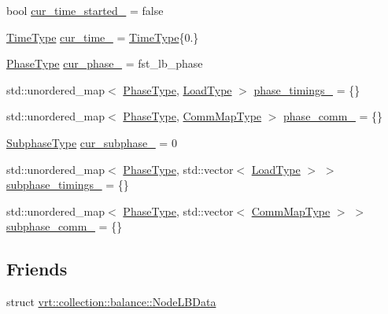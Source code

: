 \begin{DoxyCompactItemize}
\item 
bool \hyperlink{structvt_1_1elm_1_1_element_l_b_data_ae2b4a8fc5193e7aa7bc691ab1a7011ce}{cur\+\_\+time\+\_\+started\+\_\+} = false
\item 
\hyperlink{namespacevt_a2b9f28078dc309ad0706b69ded743e69}{Time\+Type} \hyperlink{structvt_1_1elm_1_1_element_l_b_data_a025fe8411b1c1458109afd4d793e9280}{cur\+\_\+time\+\_\+} = \hyperlink{namespacevt_a2b9f28078dc309ad0706b69ded743e69}{Time\+Type}\{0.\}
\item 
\hyperlink{namespacevt_a46ce6733d5cdbd735d561b7b4029f6d7}{Phase\+Type} \hyperlink{structvt_1_1elm_1_1_element_l_b_data_af82526bf8ad50c6460ba51ffc1c92a43}{cur\+\_\+phase\+\_\+} = fst\+\_\+lb\+\_\+phase
\item 
std\+::unordered\+\_\+map$<$ \hyperlink{namespacevt_a46ce6733d5cdbd735d561b7b4029f6d7}{Phase\+Type}, \hyperlink{namespacevt_a8fb51741340b87d7aaee0bef60e9896b}{Load\+Type} $>$ \hyperlink{structvt_1_1elm_1_1_element_l_b_data_af806cbf36d30d07e340577aeffe06810}{phase\+\_\+timings\+\_\+} = \{\}
\item 
std\+::unordered\+\_\+map$<$ \hyperlink{namespacevt_a46ce6733d5cdbd735d561b7b4029f6d7}{Phase\+Type}, \hyperlink{namespacevt_1_1elm_a38487cb8896b9b4763efa9022fab560e}{Comm\+Map\+Type} $>$ \hyperlink{structvt_1_1elm_1_1_element_l_b_data_a343d66fb777c54e0bdaaddf6f54eda85}{phase\+\_\+comm\+\_\+} = \{\}
\item 
\hyperlink{namespacevt_ae78cbfdf1e57470e33eedb074f2beeba}{Subphase\+Type} \hyperlink{structvt_1_1elm_1_1_element_l_b_data_a0489c5190d8a81bd5a4fba5d80d03d5d}{cur\+\_\+subphase\+\_\+} = 0
\item 
std\+::unordered\+\_\+map$<$ \hyperlink{namespacevt_a46ce6733d5cdbd735d561b7b4029f6d7}{Phase\+Type}, std\+::vector$<$ \hyperlink{namespacevt_a8fb51741340b87d7aaee0bef60e9896b}{Load\+Type} $>$ $>$ \hyperlink{structvt_1_1elm_1_1_element_l_b_data_a4307d2e80d236ad36f8d161febcb239a}{subphase\+\_\+timings\+\_\+} = \{\}
\item 
std\+::unordered\+\_\+map$<$ \hyperlink{namespacevt_a46ce6733d5cdbd735d561b7b4029f6d7}{Phase\+Type}, std\+::vector$<$ \hyperlink{namespacevt_1_1elm_a38487cb8896b9b4763efa9022fab560e}{Comm\+Map\+Type} $>$ $>$ \hyperlink{structvt_1_1elm_1_1_element_l_b_data_a3f4708b0c2d8af6627ee6df925b95890}{subphase\+\_\+comm\+\_\+} = \{\}
\end{DoxyCompactItemize}
\subsection*{Friends}
\begin{DoxyCompactItemize}
\item 
struct \hyperlink{structvt_1_1elm_1_1_element_l_b_data_a311da2f5cb4a09f74eaf7c15569996a9}{vrt\+::collection\+::balance\+::\+Node\+L\+B\+Data}
\end{DoxyCompactItemize}


